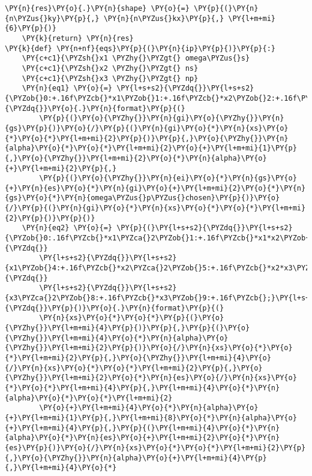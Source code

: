 \begin{Verbatim}[commandchars=\\\{\}]
    \PY{n}{res}\PY{o}{.}\PY{n}{shape} \PY{o}{=} \PY{p}{(}\PY{n}{n\PYZus{}ky}\PY{p}{,} \PY{n}{n\PYZus{}kx}\PY{p}{,} \PY{l+m+mi}{6}\PY{p}{)}
    \PY{k}{return} \PY{n}{res}
\PY{k}{def} \PY{n+nf}{eqs}\PY{p}{(}\PY{n}{ip}\PY{p}{)}\PY{p}{:}
    \PY{c+c1}{\PYZsh{}x1 \PYZhy{}\PYZgt{} omega\PYZus{}s}
    \PY{c+c1}{\PYZsh{}x2 \PYZhy{}\PYZgt{} ns}
    \PY{c+c1}{\PYZsh{}x3 \PYZhy{}\PYZgt{} np}
    \PY{n}{eq1} \PY{o}{=} \PY{l+s+s2}{\PYZdq{}}\PY{l+s+s2}{\PYZob{}0:+.16f\PYZcb{}*x1\PYZob{}1:+.16f\PYZcb{}*x2\PYZob{}2:+.16f\PYZcb{}*x3\PYZob{}3:+.16f\PYZcb{};}\PY{l+s+s2}{\PYZdq{}}\PY{o}{.}\PY{n}{format}\PY{p}{(}
        \PY{p}{(}\PY{o}{\PYZhy{}}\PY{n}{gi}\PY{o}{\PYZhy{}}\PY{n}{gs}\PY{p}{)}\PY{o}{/}\PY{p}{(}\PY{n}{gi}\PY{o}{*}\PY{n}{xs}\PY{o}{*}\PY{o}{*}\PY{l+m+mi}{2}\PY{p}{)}\PY{p}{,}\PY{o}{\PYZhy{}}\PY{n}{alpha}\PY{o}{*}\PY{o}{*}\PY{l+m+mi}{2}\PY{o}{+}\PY{l+m+mi}{1}\PY{p}{,}\PY{o}{\PYZhy{}}\PY{l+m+mi}{2}\PY{o}{*}\PY{n}{alpha}\PY{o}{+}\PY{l+m+mi}{2}\PY{p}{,}
        \PY{p}{(}\PY{o}{\PYZhy{}}\PY{n}{ei}\PY{o}{*}\PY{n}{gs}\PY{o}{+}\PY{n}{es}\PY{o}{*}\PY{n}{gi}\PY{o}{+}\PY{l+m+mi}{2}\PY{o}{*}\PY{n}{gs}\PY{o}{*}\PY{n}{omega\PYZus{}p\PYZus{}chosen}\PY{p}{)}\PY{o}{/}\PY{p}{(}\PY{n}{gi}\PY{o}{*}\PY{n}{xs}\PY{o}{*}\PY{o}{*}\PY{l+m+mi}{2}\PY{p}{)}\PY{p}{)}
    \PY{n}{eq2} \PY{o}{=} \PY{p}{(}\PY{l+s+s2}{\PYZdq{}}\PY{l+s+s2}{\PYZob{}0:.16f\PYZcb{}*x1\PYZca{}2\PYZob{}1:+.16f\PYZcb{}*x1*x2\PYZob{}2:+.16f\PYZcb{}*x1*x3\PYZob{}3:+.16f\PYZcb{}*}\PY{l+s+s2}{\PYZdq{}}
        \PY{l+s+s2}{\PYZdq{}}\PY{l+s+s2}{x1\PYZob{}4:+.16f\PYZcb{}*x2\PYZca{}2\PYZob{}5:+.16f\PYZcb{}*x2*x3\PYZob{}6:+.16f\PYZcb{}*x2\PYZob{}7:+.16f\PYZcb{}*}\PY{l+s+s2}{\PYZdq{}}
        \PY{l+s+s2}{\PYZdq{}}\PY{l+s+s2}{x3\PYZca{}2\PYZob{}8:+.16f\PYZcb{}*x3\PYZob{}9:+.16f\PYZcb{};}\PY{l+s+s2}{\PYZdq{}}\PY{p}{)}\PY{o}{.}\PY{n}{format}\PY{p}{(}
        \PY{n}{xs}\PY{o}{*}\PY{o}{*}\PY{p}{(}\PY{o}{\PYZhy{}}\PY{l+m+mi}{4}\PY{p}{)}\PY{p}{,}\PY{p}{(}\PY{o}{\PYZhy{}}\PY{l+m+mi}{4}\PY{o}{*}\PY{n}{alpha}\PY{o}{\PYZhy{}}\PY{l+m+mi}{2}\PY{p}{)}\PY{o}{/}\PY{n}{xs}\PY{o}{*}\PY{o}{*}\PY{l+m+mi}{2}\PY{p}{,}\PY{o}{\PYZhy{}}\PY{l+m+mi}{4}\PY{o}{/}\PY{n}{xs}\PY{o}{*}\PY{o}{*}\PY{l+m+mi}{2}\PY{p}{,}\PY{o}{\PYZhy{}}\PY{l+m+mi}{2}\PY{o}{*}\PY{n}{es}\PY{o}{/}\PY{n}{xs}\PY{o}{*}\PY{o}{*}\PY{l+m+mi}{4}\PY{p}{,}\PY{l+m+mi}{4}\PY{o}{*}\PY{n}{alpha}\PY{o}{*}\PY{o}{*}\PY{l+m+mi}{2}
        \PY{o}{+}\PY{l+m+mi}{4}\PY{o}{*}\PY{n}{alpha}\PY{o}{+}\PY{l+m+mi}{1}\PY{p}{,}\PY{l+m+mi}{8}\PY{o}{*}\PY{n}{alpha}\PY{o}{+}\PY{l+m+mi}{4}\PY{p}{,}\PY{p}{(}\PY{l+m+mi}{4}\PY{o}{*}\PY{n}{alpha}\PY{o}{*}\PY{n}{es}\PY{o}{+}\PY{l+m+mi}{2}\PY{o}{*}\PY{n}{es}\PY{p}{)}\PY{o}{/}\PY{n}{xs}\PY{o}{*}\PY{o}{*}\PY{l+m+mi}{2}\PY{p}{,}\PY{o}{\PYZhy{}}\PY{n}{alpha}\PY{o}{+}\PY{l+m+mi}{4}\PY{p}{,}\PY{l+m+mi}{4}\PY{o}{*}

\end{Verbatim}
